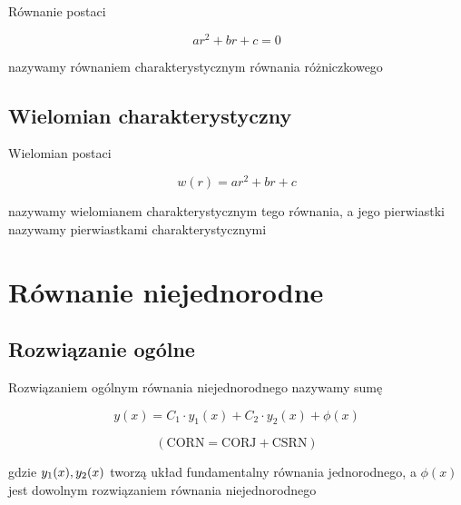 \documentclass[a4paper,12pt]{article}
\begin{document}
Równanie postaci

$$
ar^2 + br + c = 0
$$

nazywamy równaniem charakterystycznym równania różniczkowego

\subsection{Wielomian charakterystyczny}

Wielomian postaci

$$
w(r) = ar^2 + br + c
$$

nazywamy wielomianem charakterystycznym tego równania, a jego pierwiastki nazywamy pierwiastkami charakterystycznymi

\section{Równanie niejednorodne}

\subsection{Rozwiązanie ogólne}

Rozwiązaniem ogólnym równania niejednorodnego nazywamy sumę

$$
y(x) = C_1 \cdot y_1(x) + C_2 \cdot y_2(x) + \phi(x)
$$

$$
(\text{CORN} = \text{CORJ} + \text{CSRN})
$$

gdzie $y_1(x), \space y_2(x)$ tworzą układ fundamentalny równania jednorodnego, a $\phi(x)$ jest dowolnym rozwiązaniem równania niejednorodnego
\end{document}
